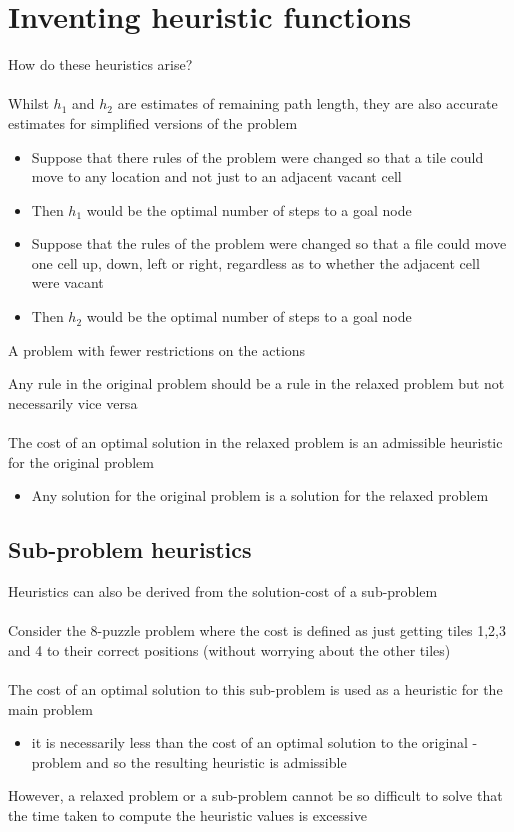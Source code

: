 \documentclass{article}[18pt]
\begin{document}
\section{Inventing heuristic functions}
How do these heuristics arise?\\
\\
Whilst $h_1$ and $h_2$ are estimates of remaining path length, they are also accurate estimates for simplified versions of the problem
\begin{itemize}
	\item Suppose that there rules of the problem were changed so that a tile could move to any location and not just to an adjacent vacant cell
	\item Then $h_1$ would be the optimal number of steps to a goal node
	\item Suppose that the rules of the problem were changed so that a file could move one cell up, down, left or right, regardless as to whether the adjacent cell were vacant
	\item Then $h_2$ would be the optimal number of steps to a goal node
\end{itemize}
\begin{defin}
A problem with fewer restrictions on the actions
\end{defin}
Any rule in the original problem should be a rule in the relaxed problem but not necessarily vice versa\\
\\
The cost of an optimal solution in the relaxed problem is an admissible heuristic for the original problem
\begin{itemize}
	\item Any solution for the original problem is a solution for the relaxed problem
\end{itemize}
\subsection{Sub-problem heuristics}
Heuristics can also be derived from the solution-cost of a sub-problem\\
\\
Consider the 8-puzzle problem where the cost is defined as just getting tiles 1,2,3 and 4 to their correct positions (without worrying about the other tiles)\\
\\
The cost of an optimal solution to this sub-problem is used as a heuristic for the main problem
\begin{itemize}
	\item it is necessarily less than the cost of an optimal solution to the original -problem and so the resulting heuristic is admissible
\end{itemize}
However, a relaxed problem or a sub-problem cannot be so difficult to solve that the time taken to compute the heuristic values is excessive
\end{document}
